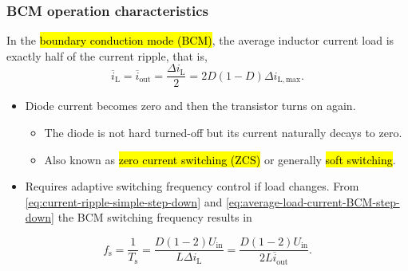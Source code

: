 \begin{frame}
    \frametitle{BCM operation characteristics}
    In the \hl{boundary conduction mode (BCM)}, the average inductor current load is exactly half of the current ripple, that is, 
    \begin{equation}
        \overline{i}_\mathrm{L}=\overline{i}_\mathrm{out}=\frac{\Delta i_\mathrm{L}}{2}= 2D(1-D)\Delta i_\mathrm{L,max}.
        \label{eq:average-load-current-BCM-step-down}
    \end{equation}
    \vspace{-0.5cm}
    \begin{itemize}
        \item Diode current becomes zero and then the transistor turns on again.
        \begin{itemize}
            \item The diode is not hard turned-off but its current naturally decays to zero.
            \item Also known as \hl{zero current switching (ZCS)} or generally \hl{soft switching}.
        \end{itemize}
        \item Requires adaptive switching frequency control if load changes. From \eqref{eq:current-ripple-simple-step-down} and \eqref{eq:average-load-current-BCM-step-down} the BCM switching frequency results in 
    \end{itemize}
    \begin{equation}
        f_\mathrm{s} = \frac{1}{T_\mathrm{s}} = \frac{D(1-2)U_\mathrm{in}}{L\Delta i_\mathrm{L} } = \frac{D(1-2)U_\mathrm{in}}{2L \overline{i}_\mathrm{out} }.
    \end{equation}
\end{frame}


